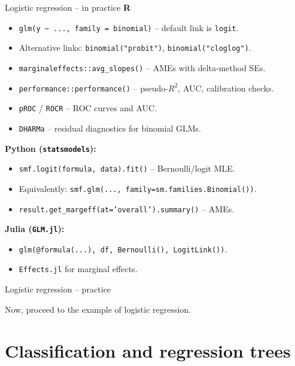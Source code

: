 \documentclass[10pt,ignorenonframetext,aspectratio=169]{beamer}
\begin{document}
\begin{frame}{Logistic regression -- in practice}
\textbf{R}
\begin{itemize}
    \justifying
    \item \texttt{glm(y \textasciitilde{} ..., family = binomial)} -- default link is \texttt{logit}.
    \item Alternative links: \texttt{binomial("probit")}, \texttt{binomial("cloglog")}.
    \item \texttt{marginaleffects::avg\_slopes()} -- AMEs with delta-method SEs.
    \item \texttt{performance::performance()} -- pseudo-$R^2$, AUC, calibration checks.
    \item \texttt{pROC} / \texttt{ROCR} -- ROC curves and AUC.
    \item \texttt{DHARMa} -- residual diagnostics for binomial GLMs.
\end{itemize}

\medskip
\textbf{Python (\texttt{statsmodels}):}
\begin{itemize}
    \justifying
    \item \texttt{smf.logit(formula, data).fit()} -- Bernoulli/logit MLE.
    \item Equivalently: \texttt{smf.glm(..., family=sm.families.Binomial())}.
    \item \texttt{result.get\_margeff(at='overall').summary()} -- AMEs.
\end{itemize}

\medskip
\textbf{Julia (\texttt{GLM.jl}):}
\begin{itemize}
    \justifying
    \item \texttt{glm(@formula(...), df, Bernoulli(), LogitLink())}.
    \item \texttt{Effects.jl} for marginal effects.
\end{itemize}
\end{frame}


\begin{frame}{Logistic regression -- practice}
\begin{center}
Now, proceed to the example of logistic regression.
\end{center}
\end{frame}

\section{Classification and regression trees}
\end{document}
